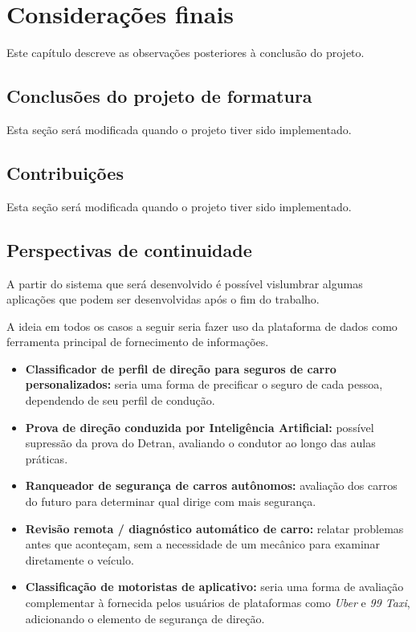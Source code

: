 \chapter{Considerações finais}

Este capítulo descreve as observações posteriores à conclusão do projeto.

\section{Conclusões do projeto de formatura}
Esta seção será modificada quando o projeto tiver sido implementado.

\section{Contribuições}
Esta seção será modificada quando o projeto tiver sido implementado.

\section{Perspectivas de continuidade}
A partir do sistema que será desenvolvido é possível vislumbrar algumas aplicações que podem ser desenvolvidas após o fim do trabalho.

A ideia em todos os casos a seguir seria fazer uso da plataforma de dados como ferramenta principal de fornecimento de informações.

\begin{itemize}
    \item \textbf{Classificador de perfil de direção para seguros de carro personalizados:} seria uma forma de precificar o seguro de cada pessoa, dependendo de seu perfil de condução.
    
    \item \textbf{Prova de direção conduzida por Inteligência Artificial:} possível supressão da prova do Detran, avaliando o condutor ao longo das aulas práticas.
    
    \item \textbf{Ranqueador de segurança de carros autônomos:} avaliação dos carros do futuro para determinar qual dirige com mais segurança.
    
    \item \textbf{Revisão remota / diagnóstico automático de carro:} relatar problemas antes que aconteçam, sem a necessidade de um mecânico para examinar diretamente o veículo.
    
    \item \textbf{Classificação de motoristas de aplicativo:} seria uma forma de avaliação complementar à fornecida pelos usuários de plataformas como \textit{Uber} e \textit{99 Taxi}, adicionando o elemento de segurança de direção.
\end{itemize}